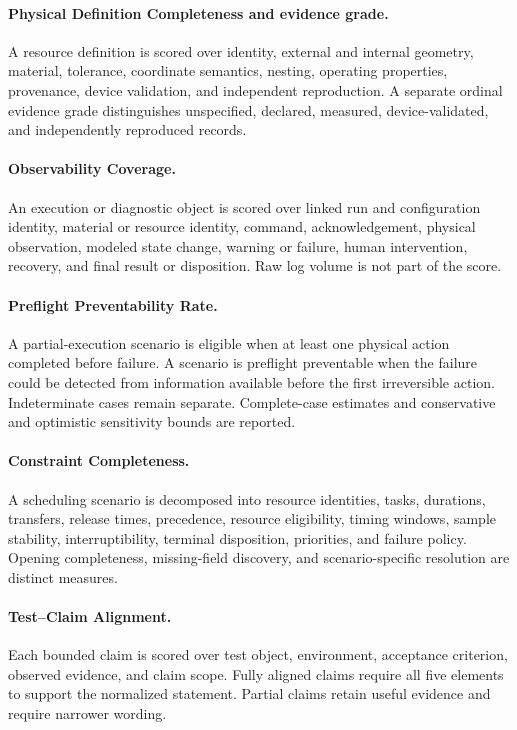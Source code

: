 \paragraph{Physical Definition Completeness and evidence grade.}
A resource definition is scored over identity, external and internal geometry, material, tolerance, coordinate semantics, nesting, operating properties, provenance, device validation, and independent reproduction. A separate ordinal evidence grade distinguishes unspecified, declared, measured, device-validated, and independently reproduced records.

\paragraph{Observability Coverage.}
An execution or diagnostic object is scored over linked run and configuration identity, material or resource identity, command, acknowledgement, physical observation, modeled state change, warning or failure, human intervention, recovery, and final result or disposition. Raw log volume is not part of the score.

\paragraph{Preflight Preventability Rate.}
A partial-execution scenario is eligible when at least one physical action completed before failure. A scenario is preflight preventable when the failure could be detected from information available before the first irreversible action. Indeterminate cases remain separate. Complete-case estimates and conservative and optimistic sensitivity bounds are reported.

\paragraph{Constraint Completeness.}
A scheduling scenario is decomposed into resource identities, tasks, durations, transfers, release times, precedence, resource eligibility, timing windows, sample stability, interruptibility, terminal disposition, priorities, and failure policy. Opening completeness, missing-field discovery, and scenario-specific resolution are distinct measures.

\paragraph{Test--Claim Alignment.}
Each bounded claim is scored over test object, environment, acceptance criterion, observed evidence, and claim scope. Fully aligned claims require all five elements to support the normalized statement. Partial claims retain useful evidence and require narrower wording.

